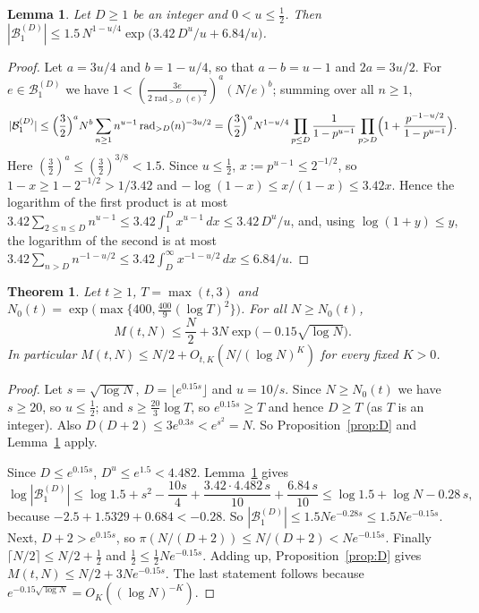 \documentclass[11pt]{amsart}
\newtheorem{theorem}{Theorem}
\newtheorem{lemma}{Lemma}[section]
\theoremstyle{definition}
\theoremstyle{remark}
\newcommand{\rad}{\operatorname{rad}}
\newcommand{\Bad}{\mathcal{B}}
\begin{document}
\begin{lemma}\label{lem:rankinD}
Let $D\ge1$ be an integer and $0<u\le\frac12$. Then
$|\Bad_1^{(D)}|\le 1.5\,N^{1-u/4}\exp\bigl(3.42\,D^u/u+6.84/u\bigr)$.
\end{lemma}

\begin{proof}
Let $a=3u/4$ and $b=1-u/4$, so that $a-b=u-1$ and $2a=3u/2$. For $e\in\Bad_1^{(D)}$ we have $1<(\frac{3e}{2\rad_{>D}(e)^2})^a(N/e)^b$; summing over all $n\ge1$,
\[
|\Bad_1^{(D)}|\le\Bigl(\frac32\Bigr)^aN^{b}\sum_{n\ge1}n^{u-1}\rad_{>D}(n)^{-3u/2}
=\Bigl(\frac32\Bigr)^aN^{1-u/4}\prod_{p\le D}\frac1{1-p^{u-1}}\prod_{p>D}\Bigl(1+\frac{p^{-1-u/2}}{1-p^{u-1}}\Bigr).
\]
Here $(\frac32)^a\le(\frac32)^{3/8}<1.5$. Since $u\le\frac12$, $x:=p^{u-1}\le2^{-1/2}$, so $1-x\ge1-2^{-1/2}>1/3.42$ and $-\log(1-x)\le x/(1-x)\le3.42x$. Hence the logarithm of the first product is at most $3.42\sum_{2\le n\le D}n^{u-1}\le3.42\int_1^Dx^{u-1}\,dx\le3.42\,D^u/u$, and, using $\log(1+y)\le y$, the logarithm of the second is at most $3.42\sum_{n>D}n^{-1-u/2}\le3.42\int_D^\infty x^{-1-u/2}\,dx\le6.84/u$.
\end{proof}

\begin{theorem}\label{thm:B}
Let $t\ge1$, $T=\max(t,3)$ and $N_0(t)=\exp\bigl(\max\{400,\tfrac{400}9(\log T)^2\}\bigr)$. For all $N\ge N_0(t)$,
\[
M(t,N)\le\frac N2+3N\exp\bigl(-0.15\sqrt{\log N}\bigr).
\]
In particular $M(t,N)\le N/2+O_{t,K}(N/(\log N)^K)$ for every fixed $K>0$.
\end{theorem}

\begin{proof}
Let $s=\sqrt{\log N}$, $D=\lfloor e^{0.15s}\rfloor$ and $u=10/s$. Since $N\ge N_0(t)$ we have $s\ge20$, so $u\le\frac12$; and $s\ge\frac{20}3\log T$, so $e^{0.15s}\ge T$ and hence $D\ge T$ (as $T$ is an integer). Also $D(D+2)\le3e^{0.3s}<e^{s^2}=N$. So Proposition~\ref{prop:D} and Lemma~\ref{lem:rankinD} apply.

Since $D\le e^{0.15s}$, $D^u\le e^{1.5}<4.482$. Lemma~\ref{lem:rankinD} gives
\[
\log|\Bad_1^{(D)}|\le\log1.5+s^2-\frac{10s}{4}+\frac{3.42\cdot4.482\,s}{10}+\frac{6.84\,s}{10}\le\log1.5+\log N-0.28\,s,
\]
because $-2.5+1.5329+0.684<-0.28$. So $|\Bad_1^{(D)}|\le1.5N e^{-0.28s}\le1.5Ne^{-0.15s}$. Next, $D+2>e^{0.15s}$, so $\pi(N/(D+2))\le N/(D+2)<Ne^{-0.15s}$. Finally $\lceil N/2\rceil\le N/2+\frac12$ and $\frac12\le\frac12Ne^{-0.15s}$. Adding up, Proposition~\ref{prop:D} gives $M(t,N)\le N/2+3Ne^{-0.15s}$.
The last statement follows because $e^{-0.15\sqrt{\log N}}=O_K((\log N)^{-K})$.
\end{proof}
\end{document}
